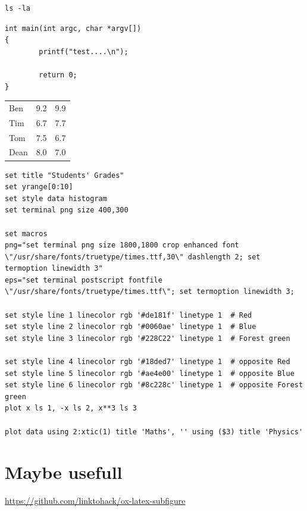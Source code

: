 \documentclass{article}
\begin{document}
\begin{verbatim}
ls -la
\end{verbatim}

\begin{verbatim}
int main(int argc, char *argv[])
{
        printf("test....\n");

        return 0;
}
\end{verbatim}



\begin{table}[htbp]
\label{tab:orge708a14}
\centering
\begin{tabular}{lrr}
Ben & 9.2 & 9.9\\[0pt]
Tim & 6.7 & 7.7\\[0pt]
Tom & 7.5 & 6.7\\[0pt]
Dean & 8.0 & 7.0\\[0pt]
\end{tabular}
\end{table}

\begin{verbatim}
set title "Students' Grades"
set yrange[0:10]
set style data histogram
set terminal png size 400,300

set macros
png="set terminal png size 1800,1800 crop enhanced font \"/usr/share/fonts/truetype/times.ttf,30\" dashlength 2; set termoption linewidth 3"
eps="set terminal postscript fontfile \"/usr/share/fonts/truetype/times.ttf\"; set termoption linewidth 3;

set style line 1 linecolor rgb '#de181f' linetype 1  # Red
set style line 2 linecolor rgb '#0060ae' linetype 1  # Blue
set style line 3 linecolor rgb '#228C22' linetype 1  # Forest green

set style line 4 linecolor rgb '#18ded7' linetype 1  # opposite Red
set style line 5 linecolor rgb '#ae4e00' linetype 1  # opposite Blue
set style line 6 linecolor rgb '#8c228c' linetype 1  # opposite Forest green
plot x ls 1, -x ls 2, x**3 ls 3

plot data using 2:xtic(1) title 'Maths', '' using ($3) title 'Physics'
\end{verbatim}


\section{Maybe usefull}
\label{sec:orgd8ee9c4}
\url{https://github.com/linktohack/ox-latex-subfigure}
\end{document}
